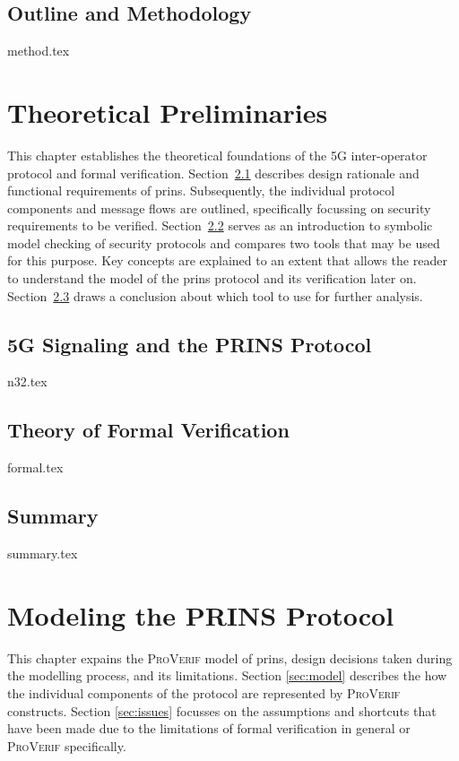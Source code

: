 \documentclass[a4paper,12pt,twoside]{report}
\begin{document}
\section{Outline and Methodology}
\label{sec:outline}
{method.tex}

\clearpage

\chapter{Theoretical Preliminaries}
\label{chap:theory}

This chapter establishes the theoretical foundations of the 5G inter-operator protocol and formal verification.
Section~\ref{sec:n32} describes design rationale and functional requirements of \gls{prins}.
Subsequently, the individual protocol components and message flows are outlined, specifically focussing on security requirements to be verified.
Section~\ref{sec:formal} serves as an introduction to symbolic model checking of security protocols and compares two tools that may be used for this purpose.
Key concepts are explained to an extent that allows the reader to understand the model of the \gls{prins} protocol and its verification later on.
Section~\ref{sec:summary} draws a conclusion about which tool to use for further analysis.

\section{5G Signaling and the PRINS Protocol}
\label{sec:n32}
{n32.tex}

\section{Theory of Formal Verification}
\label{sec:formal}
{formal.tex}

\section{Summary}
\label{sec:summary}
{summary.tex}

\clearpage

\chapter{Modeling the PRINS Protocol}
\label{chap:modeling}

This chapter expains the \textsc{ProVerif} model of \gls{prins}, design decisions taken during the modelling process, and its limitations.
Section \ref{sec:model} describes the how the individual components of the protocol are represented by \textsc{ProVerif} constructs.
Section \ref{sec:issues} focusses on the assumptions and shortcuts that have been made due to the limitations of formal verification in general or \textsc{ProVerif} specifically.
\end{document}

